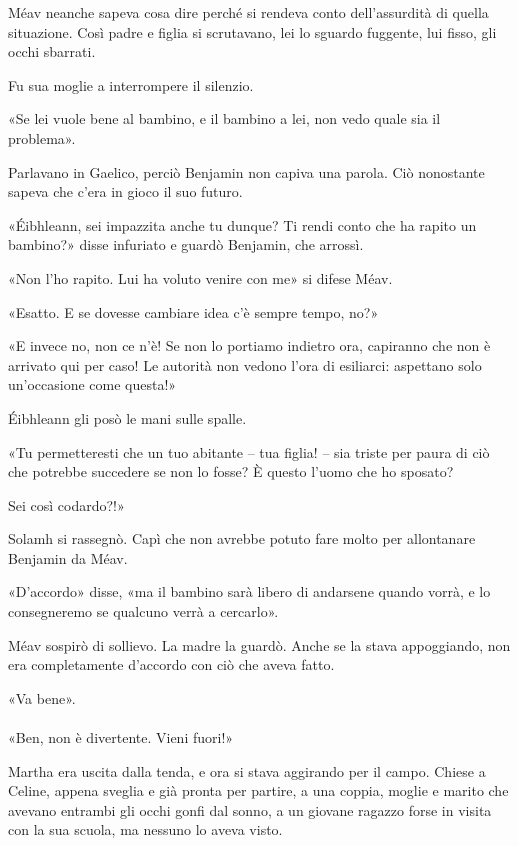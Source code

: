 \documentclass[a4paper,12pt]{book}
\begin{document}
Méav neanche sapeva cosa dire perché si rendeva conto dell'assurdità di
quella situazione. Così padre e figlia si scrutavano, lei lo sguardo fuggente,
lui fisso, gli occhi sbarrati.

Fu sua moglie a interrompere il silenzio.

«Se lei vuole bene al bambino, e il bambino a lei, non vedo quale sia il
problema».

Parlavano in Gaelico, perciò Benjamin non capiva una parola. Ciò nonostante
sapeva che c'era in gioco il suo futuro.

«Éibhleann, sei impazzita anche tu dunque? Ti rendi conto che ha rapito un
bambino?» disse infuriato e guardò Benjamin, che arrossì.

«Non l'ho rapito. Lui ha voluto venire con me» si difese Méav.

«Esatto. E se dovesse cambiare idea c'è sempre tempo, no?»

«E invece no, non ce n'è! Se non lo portiamo indietro ora, capiranno che non
è arrivato qui per caso! Le autorità non vedono l'ora di esiliarci: aspettano
solo un'occasione come questa!»

Éibhleann gli posò le mani sulle spalle.

«Tu permetteresti che un tuo abitante -- tua figlia! -- sia triste per paura
di ciò che potrebbe succedere se non lo fosse? È questo l'uomo che ho sposato?

Sei così codardo?!»

Solamh si rassegnò. Capì che non avrebbe potuto fare molto per allontanare
Benjamin da Méav.

«D'accordo» disse, «ma il bambino sarà libero di andarsene quando vorrà, e
lo consegneremo se qualcuno verrà a cercarlo».

Méav sospirò di sollievo. La madre la guardò. Anche se la stava appoggiando,
non era completamente d'accordo con ciò che aveva fatto.

«Va bene».

\paragraph{}
«Ben, non è divertente. Vieni fuori!»

Martha era uscita dalla tenda, e ora si stava aggirando per il campo. Chiese a
Celine, appena sveglia e già pronta per partire, a una coppia, moglie e marito
che avevano entrambi gli occhi gonfi dal sonno, a un giovane ragazzo forse in
visita con la sua scuola, ma nessuno lo aveva visto.
\end{document}
